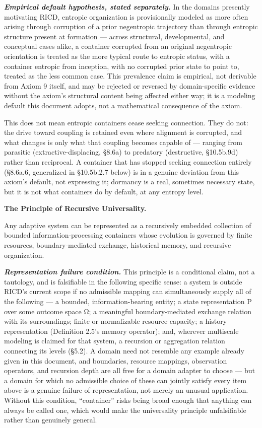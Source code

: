 \documentclass[
]{article}
\begin{document}
\emph{\textbf{Empirical default hypothesis, stated separately.}} In the
domains presently motivating RICD, entropic organization is
provisionally modeled as more often arising through corruption of a
prior negentropic trajectory than through entropic structure present at
formation --- across structural, developmental, and conceptual cases
alike, a container corrupted from an original negentropic orientation is
treated as the more typical route to entropic status, with a container
entropic from inception, with no corrupted prior state to point to,
treated as the less common case. This prevalence claim is empirical, not
derivable from Axiom 9 itself, and may be rejected or reversed by
domain-specific evidence without the axiom's structural content being
affected either way; it is a modeling default this document adopts, not
a mathematical consequence of the axiom.

This does not mean entropic containers cease seeking connection. They do
not: the drive toward coupling is retained even where alignment is
corrupted, and what changes is only what that coupling becomes capable
of --- ranging from parasitic (extractive-displacing, §8.6a) to
predatory (destructive, §10.5b.9d) rather than reciprocal. A container
that has stopped seeking connection entirely (§8.6a.6, generalized in
§10.5b.2.7 below) is in a genuine deviation from this axiom's default,
not expressing it; dormancy is a real, sometimes necessary state, but it
is not what containers do by default, at any entropy level.

\textbf{The Principle of Recursive Universality.}

Any adaptive system can be represented as a recursively embedded
collection of bounded information-processing containers whose evolution
is governed by finite resources, boundary-mediated exchange, historical
memory, and recursive organization.

\emph{\textbf{Representation failure condition.}} This principle is a
conditional claim, not a tautology, and is falsifiable in the following
specific sense: a system is outside RICD's current scope if no
admissible mapping can simultaneously supply all of the following --- a
bounded, information-bearing entity; a state representation P over some
outcome space Ω; a meaningful boundary-mediated exchange relation with
its surroundings; finite or normalizable resource capacity; a history
representation (Definition 2.5's memory operator); and, wherever
multiscale modeling is claimed for that system, a recursion or
aggregation relation connecting its levels (§5.2). A domain need not
resemble any example already given in this document, and boundaries,
resource mappings, observation operators, and recursion depth are all
free for a domain adapter to choose --- but a domain for which no
admissible choice of these can jointly satisfy every item above is a
genuine failure of representation, not merely an unusual application.
Without this condition, ``container'' risks being broad enough that
anything can always be called one, which would make the universality
principle unfalsifiable rather than genuinely general.
\end{document}
